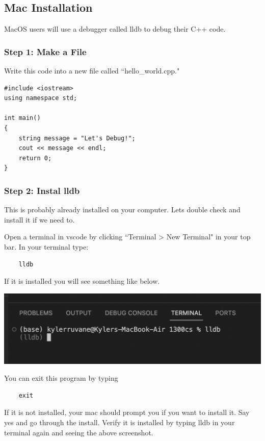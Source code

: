 \subsection{Mac Installation}

MacOS users will use a debugger called lldb to debug their C++ code.

\subsubsection{Step 1: Make a File}

Write this code into a new file called ``hello\_world.cpp."

\begin{verbatim}
#include <iostream>
using namespace std;

int main()
{
    string message = "Let's Debug!";
    cout << message << endl;
    return 0;
}
\end{verbatim}

\subsubsection{Step 2: Instal lldb}

This is probably already installed on your computer. Lets double check and install it if we need to. 

Open a terminal in vscode by clicking ``Terminal > New Terminal" in your top bar.  In your terminal type:

\begin{verbatim}
    lldb
\end{verbatim}

If it is installed you will see something like below.

\includegraphics[width=\textwidth]{images/macDebuggerSetup/debugger_mac_1.png}

You can exit this program by typing

\begin{verbatim}
    exit
\end{verbatim}

If it is not installed, your mac should prompt you if you want to install it. Say yes and go through the install. Verify it is installed by typing lldb in your terminal again and seeing the above screenshot.

